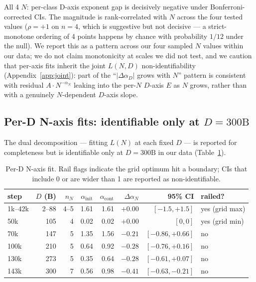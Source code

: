 \documentclass[10pt]{article}
\newcommand{\dalpha}{\Delta\alpha}
\newcommand{\ainit}{\alpha_\mathrm{init}}
\newcommand{\acont}{\alpha_\mathrm{cont}}
\begin{document}
All 4 $N$: per-class D-axis exponent gap is decisively negative under
Bonferroni-corrected CIs. The magnitude is rank-correlated with $N$
across the four tested values ($\rho = +1$ on $n{=}4$, which is
suggestive but not decisive --- a strict-monotone ordering of 4
points happens by chance with probability $1/12$ under the null). We
report this as a pattern across our four sampled $N$ values within
our data; we do not claim monotonicity at scales we did not test, and
we caution that per-axis fits inherit the joint $L(N, D)$
non-identifiability (Appendix~\ref{app:joint}): part of the
``$|\dalpha_D|$ grows with $N$'' pattern is consistent with residual
$A \cdot N^{-\alpha_N}$ leaking into the per-$N$ $D$-axis $E$ as $N$
grows, rather than with a genuinely $N$-dependent $D$-axis slope.

\subsection{Per-D N-axis fits: identifiable only at $D{=}300\text{B}$}
\label{sec:perD}

The dual decomposition --- fitting $L(N)$ at each fixed $D$ --- is
reported for completeness but is identifiable only at $D{=}300\text{B}$
in our data (Table~\ref{tab:perD}).

\begin{table}[t]
\caption{Per-D N-axis fit. Rail flags indicate the grid optimum hit a boundary; CIs that include 0 or are wider than 1 are reported as non-identifiable.}
\label{tab:perD}
\centering
\small
\begin{tabular}{lrrrrrrl}
\toprule
step & $D$ (B) & $n_N$ & $\ainit$ & $\acont$ & $\dalpha_N$ & 95\% CI & railed? \\
\midrule
1k--42k  & 2--88 & 4--5 & 1.61 & 1.61 & $+0.00$ & $[-1.5, +1.5]$ & yes (grid max) \\
50k      & 105   & 4    & 0.02 & 0.02 & $+0.00$ & $[0, 0]$ & yes (grid min) \\
70k      & 147   & 5    & 1.35 & 1.56 & $-0.21$ & $[-0.86, +0.66]$ & no \\
100k     & 210   & 5    & 0.64 & 0.92 & $-0.28$ & $[-0.76, +0.16]$ & no \\
130k     & 273   & 5    & 0.35 & 0.64 & $-0.28$ & $[-0.61, +0.07]$ & no \\
143k     & 300   & 7    & 0.56 & 0.98 & $\mathbf{-0.41}$ & $\mathbf{[-0.63, -0.21]}$ & no \\
\bottomrule
\end{tabular}
\end{table}
\end{document}
